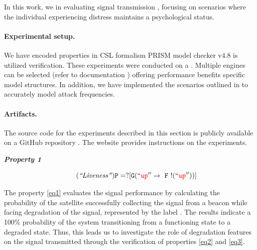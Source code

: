 In this work, we  in evaluating signal transmission ,  focusing on scenarios where the individual experiencing distress maintains a  psychological status. 

\paragraph{Experimental setup.} We have encoded properties in CSL formalism  PRISM model checker v4.8 \cite{Kwiatkowska2020} is utilized  verification. These experiments were conducted on a . Multiple engines can be selected (refer to documentation \cite{engines}) offering performance benefits  specific model structures. In addition, we have implemented the scenarios outlined in \cite{Zhu2009} to accurately model attack frequencies.

\paragraph{Artifacts.} The source code for the experiments described in this section is publicly available on a GitHub repository \cite{newcas2025}. The website provides  instructions on  the experiments.

	    \begin{resp}{\textbf{\textit{Property 1}}}
        
        \begin{equation}
        \label{eq1}\tag{\emph{\quot{Liveness}}}
         \mathtt{ P=? [ G(\quot{\textcolor{red}{up} } \xrightarrow{} \  F \ !(\quot{\textcolor{red}{up} }))  ]} 
        \end{equation}

        
        \end{resp}
        
        \normalsize

The property \ref{eq1} evaluates the signal performance by calculating the probability of the satellite successfully collecting the signal from a beacon while facing degradation of the signal, represented by the label \emath{!\quot{\textcolor{red}{up} }}. The results indicate a 100\% probability of the system transitioning from a functioning state to a degraded state. Thus, this leads us to investigate the role of degradation features on the signal transmitted through the verification of properties \ref{eq2} and \ref{eq3}.


